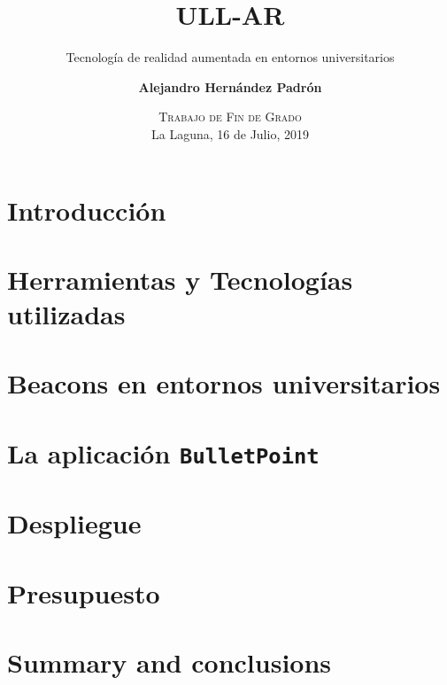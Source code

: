 \documentclass[blue,uncompressed]{beamer}
\title{\textbf{ULL-AR}}
\subtitle{Tecnología de realidad aumentada en entornos universitarios}
\author[Alejandro Hernández Padrón]
{
	\textbf{Alejandro Hernández Padrón}
}
\institute[ULL]
\date[Trabajo de Fin de Grado]{\textsc{Trabajo de Fin de Grado}     \\
                           La Laguna, 16 de Julio, 2019}
\newcommand{\ULLAR}{\texttt{BulletPoint{}}}
\begin{document}
	\begin{frame}[plain]
	\titlepage
	\end{frame}

		\section{Introducción}
			
		\section{Herramientas y Tecnologías utilizadas}
			
		\section{Beacons en entornos universitarios}
			
		\section{La aplicación \ULLAR}
			
		\section{Despliegue}
			
		\section{Presupuesto}	
			
		\section{Summary and conclusions}
			
		
		
\end{document}
